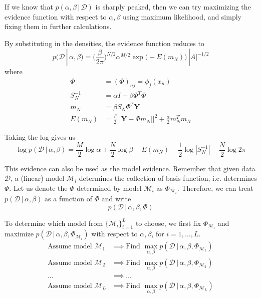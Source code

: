   If we know that $p(\alpha, \beta \,|\,\mathcal{D})$ is sharply peaked, then we can try maximizing the evidence function with respect to $\alpha, \beta$ using maximum likelihood, and simply fixing them in further calculations.

  By substituting in the densities, the evidence function reduces to
  \begin{equation}
    p(\mathcal{D}\,|\,\alpha, \beta) = \bigg(\frac{\beta}{2 \pi}\bigg)^{N/2} \alpha^{M/2} \exp\big( -E (m_N)\big) \,|A|^{-1/2}
  \end{equation}
  where
  \begin{align*}
    \Phi & = (\Phi)_{nj} = \phi_j (x_n) \\
    S_N^{-1} & = \alpha I + \beta \Phi^T \Phi \\
    m_N & = \beta S_N \Phi^T \mathbf{Y} \\
    E(m_N) & = \frac{\beta}{2} ||\mathbf{Y} - \Phi m_N||^2 + \frac{\alpha}{2} m_N^T m_N
  \end{align*}

  Taking the log gives us
  \begin{equation}
    \log{p(\mathcal{D}\,|\,\alpha, \beta)} = \frac{M}{2}\log{\alpha} + \frac{N}{2} \log{\beta} - E(m_N) - \frac{1}{2} \log{|S_N^{-1}|} - \frac{N}{2} \log{2 \pi}
  \end{equation}

  This evidence can also be used as the model evidence. Remember that given data $\mathcal{D}$, a (linear) model $\mathcal{M}_i$ determines the collection of basis function, i.e. determines $\Phi$. Let us denote the $\Phi$ determined by model $\mathcal{M}_i$ as $\Phi_{\mathcal{M}_i}$. Therefore, we can treat $p(\mathcal{D}\,|\,\alpha, \beta)$ as a function of $\Phi$ and write
  \begin{equation}
    p(\mathcal{D}\,|\,\alpha, \beta, \Phi)
  \end{equation}

  To determine which model from $\{\mathcal{M}_i\}_{i=1}^L$ to choose, we first fix $\Phi_{\mathcal{M}_i}$ and maximize $p(\mathcal{D}\,|\,\alpha, \beta, \Phi_{\mathcal{M}_i})$ with respect to $\alpha, \beta$, for $i = 1, \ldots, L$.
  \begin{align*}
    \text{Assume model } \mathcal{M}_1 & \implies \text{Find } \max_{\alpha, \beta} p(\mathcal{D}\,|\,\alpha, \beta, \Phi_{\mathcal{M}_1}) \\
    \text{Assume model } \mathcal{M}_2 & \implies \text{Find } \max_{\alpha, \beta} p(\mathcal{D}\,|\,\alpha, \beta, \Phi_{\mathcal{M}_2}) \\
    \ldots & \implies \ldots \\
    \text{Assume model } \mathcal{M}_L & \implies \text{Find } \max_{\alpha, \beta} p(\mathcal{D}\,|\,\alpha, \beta, \Phi_{\mathcal{M}_L})
  \end{align*}

